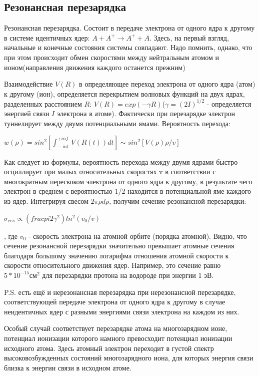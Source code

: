 \documentclass[10pt, a4paper]{article}
\begin{document}
\subsection{Резонансная перезарядка}
\label{sec.2.5}

Резонансная перезарядка. Состоит в передаче электрона от одного ядра к другому в системе идентичных ядер: $A + A^{+} \rightarrow A^{+} + A$. Здесь, на первый взгляд, начальные и конечные состояния системы совпадают. Надо помнить, однако, что при этом происходит обмен скоростями между нейтральным атомом и ионом(направления движения каждого останется прежним)

Взаимодействие $V(R)$ в  определяющее переход электрона от одного ядра (атом) к другому (ион), определяется перекрытием волновых функций на двух ядрах, разделенных  
расстоянием $R$: $V(R)=exp(-\gamma R)$($\gamma=(2I)^{1/2}$ - определяется энергией связи $I$ электрона в атоме). Фактически при перезарядке электрон туннелирует между двумя потенциальными ямами. Вероятность перехода:

$w(\rho)=sin^{2}[ \int_{-\inf}^{+inf} V(R(t))dt] \sim sin^{2}[V(\rho)\rho/v]$

Как следует из формулы, вероятность перехода между двумя ядрами быстро осциллирует при малых относительных скоростях v в соответствии с многократным перескоком электрона от одного ядра к другому, в результате чего электрон в среднем с вероятностью 1/2  находится в потенциальной яме каждого из ядер. Интегрируя свесом $2\pi\rho d\rho$, получим сечение резонансной перезарядки:

$\sigma_{res}\propto(frac{pi}{2\gamma^{2}})ln^{2}(v_0/v)$

, где $v_0$ - скорость электрона на атомной орбите (порядка атомной). Видно, что сечение резонансной перезарядки значительно превышает атомные сечения благодаря большому значению логарифма  отношения атомной скорости к скорости относительного движения ядер.  Например, это сечение равно $5*10^{-15} см^{2}$ для перезарядки протона на водороде при энергии 1 эВ.

P.S. есть ещё и нерезонансная перезарядка при нерезонансной перезарядке, соответствующей передаче электрона от одного ядра к другому в случае неидентичных ядер с разными энергиями 
связи электрона на каждом из них.

Особый случай соответствует перезарядке атома на многозарядном ионе, потенциал ионизации которого намного превосходит потенциал ионизации исходного атома. Здесь атомный электрон переходит в густой спектр высоковозбужденных состояний многозарядного иона, для которых энергия связи близка к энергии связи в исходном атоме.
\end{document}
